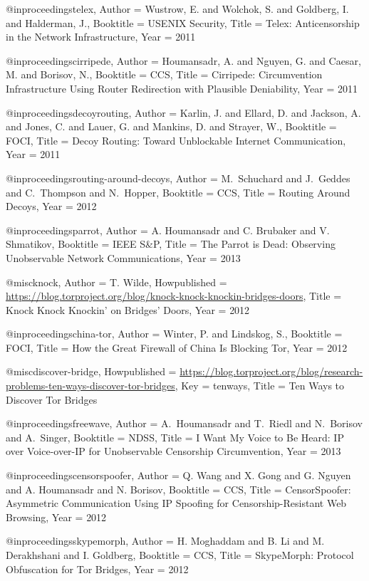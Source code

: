 {{{{{{{	@inproceedings{telex,
	Author = {Wustrow, E. and Wolchok, S. and Goldberg, I. and Halderman, J.},
	Booktitle = {{USENIX Security}},
	Title = {{Telex: Anticensorship in the Network Infrastructure}},
	Year = {2011}}
	
	@inproceedings{cirripede,
	Author = {Houmansadr, A. and Nguyen, G. and Caesar, M. and Borisov, N.},
	Booktitle = {CCS},
	Title = {{Cirripede: Circumvention Infrastructure Using Router Redirection with Plausible Deniability}},
	Year = {2011}}
	
	@inproceedings{decoyrouting,
	Author = {Karlin, J. and Ellard, D. and Jackson, A. and Jones, C. and Lauer, G. and Mankins, D. and Strayer, W.},
	Booktitle = {{FOCI}},
	Title = {{Decoy Routing: Toward Unblockable Internet Communication}},
	Year = {2011}}
	
	@inproceedings{routing-around-decoys,
	Author = {M.~Schuchard and J.~Geddes and C.~Thompson and N.~Hopper},
	Booktitle = {{CCS}},
	Title = {{Routing Around Decoys}},
	Year = {2012}}
	
	@inproceedings{parrot,
	Author = {A. Houmansadr and C. Brubaker and V. Shmatikov},
	Booktitle = {IEEE S\&P},
	Title = {{The Parrot is Dead: Observing Unobservable Network Communications}},
	Year = {2013}}
	
	@misc{knock,
	Author = {T. Wilde},
	Howpublished = {\url{https://blog.torproject.org/blog/knock-knock-knockin-bridges-doors}},
	Title = {{Knock Knock Knockin' on Bridges' Doors}},
	Year = {2012}}
	
	@inproceedings{china-tor,
	Author = {Winter, P. and Lindskog, S.},
	Booktitle = {{FOCI}},
	Title = {{How the Great Firewall of China Is Blocking Tor}},
	Year = {2012}}
	
	@misc{discover-bridge,
	Howpublished = {\url{https://blog.torproject.org/blog/research-problems-ten-ways-discover-tor-bridges}},
	Key = {tenways},
	Title = {{Ten Ways to Discover Tor Bridges}}}
	
	@inproceedings{freewave,
	Author = {A.~Houmansadr and T.~Riedl and N.~Borisov and A.~Singer},
	Booktitle = {{NDSS}},
	Title = {{I Want My Voice to Be Heard: IP over Voice-over-IP for Unobservable Censorship Circumvention}},
	Year = 2013}
	
	@inproceedings{censorspoofer,
	Author = {Q. Wang and X. Gong and G. Nguyen and A. Houmansadr and N. Borisov},
	Booktitle = {CCS},
	Title = {{CensorSpoofer: Asymmetric Communication Using IP Spoofing for Censorship-Resistant Web Browsing}},
	Year = {2012}}
	
	@inproceedings{skypemorph,
	Author = {H. Moghaddam and B. Li and M. Derakhshani and I. Goldberg},
	Booktitle = {CCS},
	Title = {{SkypeMorph: Protocol Obfuscation for Tor Bridges}},
	Year = {2012}}
	
}}}}}}}
